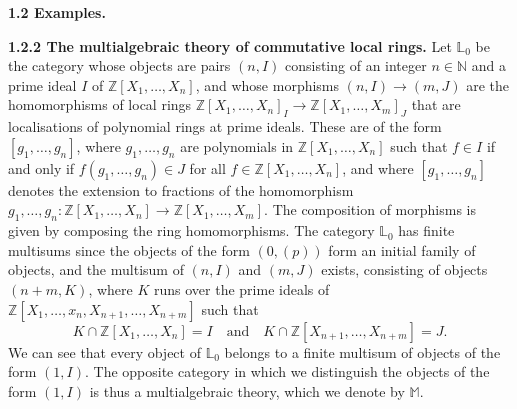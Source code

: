 \documentclass{article}
\newenvironment{rmenv}[1]
  {\phantomsection\par\medskip\noindent\textbf{#1.}\rmfamily}
  {\medskip}
\newcommand{\bb}[1]{{\mathbb{#1}}}
\begin{document}
\begin{rmenv}{1.2 Examples}
  \begin{rmenv}{1.2.2 The multialgebraic theory of commutative local rings}
  \label{1.2.2}
    Let $\bb{L}_0$ be the category whose objects are pairs $(n,I)$ consisting of an integer $n\in\bb{N}$ and a prime ideal $I$ of $\bb{Z}[X_1,\ldots,X_n]$, and whose morphisms $(n,I)\to(m,J)$ are the homomorphisms of local rings $\bb{Z}[X_1,\ldots,X_n]_I\to\bb{Z}[X_1,\ldots,X_m]_J$ that are localisations of polynomial rings at prime ideals.
    These are of the form $[g_1,\ldots,g_n]$, where $g_1,\ldots,g_n$ are polynomials in $\bb{Z}[X_1,\ldots,X_n]$ such that $f\in I$ if and only if $f(g_1,\ldots,g_n)\in J$ for all $f\in\bb{Z}[X_1,\ldots,X_n]$, and where $[g_1,\ldots,g_n]$ denotes the extension to fractions of the homomorphism $g_1,\ldots,g_n\colon\bb{Z}[X_1,\ldots,X_n]\to\bb{Z}[X_1,\ldots,X_m]$.
    The composition of morphisms is given by composing the ring homomorphisms.
    The category $\bb{L}_0$ has finite multisums since the objects of the form $(0,(p))$ form an initial family of objects, and the multisum of $(n,I)$ and $(m,J)$ exists, consisting of objects $(n+m,K)$, where $K$ runs over the prime ideals of $\bb{Z}[X_1,\ldots,x_n,X_{n+1},\ldots,X_{n+m}]$ such that
    \[
      K\cap\bb{Z}[X_1,\ldots,X_n] = I
      \quad\text{and}\quad
      K\cap\bb{Z}[X_{n+1},\ldots,X_{n+m}] = J.
    \]
    We can see that every object of $\bb{L}_0$ belongs to a finite multisum of objects of the form $(1,I)$.
    The opposite category in which we distinguish the objects of the form $(1,I)$ is thus a multialgebraic theory, which we denote by $\bb{M}$.


\end{rmenv}
\end{rmenv}
\end{document}
